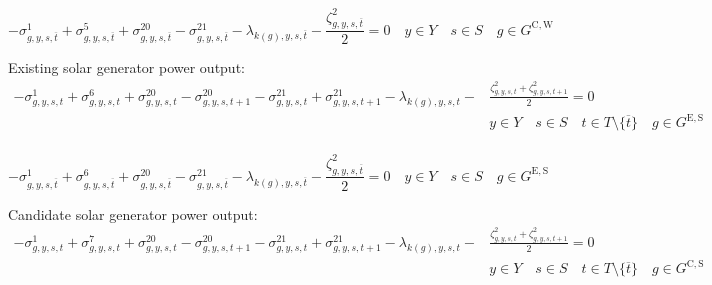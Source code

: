 \documentclass{article}
\newcommand{\sGeneratorsExistingSolar}{G^{\mathrm{E,S}}}
\newcommand{\sGeneratorsCandidateWind}{G^{\mathrm{C,W}}}
\newcommand{\sGeneratorsCandidateSolar}{G^{\mathrm{C,S}}}
\newcommand{\sYears}{Y}
\newcommand{\sScenarios}{S}
\newcommand{\sIntervals}{T}
\newcommand{\iGenerator}{g}
\newcommand{\iYear}{y}
\newcommand{\iScenario}{s}
\newcommand{\iInterval}{t}
\newcommand{\iIntervalTerminal}{\overline{\iInterval}}
\newcommand{\iZone}{z}
\newcommand{\dMinPowerOutput}[1][\iGenerator,\iYear,\iScenario,\iInterval]{\sigma_{#1}^{1}}
\newcommand{\dMaxPowerOutputWindCandidate}[1][\iGenerator,\iYear,\iScenario,\iInterval]{\sigma_{#1}^{5}}
\newcommand{\dMaxPowerOutputSolarExisting}[1][\iGenerator,\iYear,\iScenario,\iInterval]{\sigma_{#1}^{6}}
\newcommand{\dMaxPowerOutputSolarCandidate}[1][\iGenerator,\iYear,\iScenario,\iInterval]{\sigma_{#1}^{7}}
\newcommand{\dRampRateUp}[1][\iGenerator,\iYear,\iScenario,\iInterval]{\sigma_{#1}^{20}}
\newcommand{\dRampRateDown}[1][\iGenerator,\iYear,\iScenario,\iInterval]{\sigma_{#1}^{21}}
\newcommand{\dPowerBalance}[1][\iZone,\iYear,\iScenario,\iInterval]{\lambda_{#1}}
\newcommand{\dGeneratorEnergyOutput}[1][\iGenerator,\iYear,\iScenario,\iInterval]{\zeta_{#1}^{2}}
\begin{document}
\begin{equation}
-\dMinPowerOutput[\iGenerator,\iYear,\iScenario,\iIntervalTerminal] + \dMaxPowerOutputWindCandidate[\iGenerator,\iYear,\iScenario,\iIntervalTerminal] + \dRampRateUp[\iGenerator,\iYear,\iScenario,\iIntervalTerminal] - \dRampRateDown[\iGenerator,\iYear,\iScenario,\iIntervalTerminal] - \dPowerBalance[k(\iGenerator),\iYear,\iScenario,\iIntervalTerminal] - \frac{\dGeneratorEnergyOutput[\iGenerator,\iYear,\iScenario,\iIntervalTerminal]}{2} = 0 \quad \iYear \in \sYears \quad \iScenario \in \sScenarios \quad \iGenerator \in \sGeneratorsCandidateWind
\end{equation}

Existing solar generator power output:
\begin{align}
-\dMinPowerOutput + \dMaxPowerOutputSolarExisting + \dRampRateUp - \dRampRateUp[\iGenerator,\iYear,\iScenario,\iInterval+1] - \dRampRateDown + \dRampRateDown[\iGenerator,\iYear,\iScenario,\iInterval+1] - \dPowerBalance[k(\iGenerator),\iYear,\iScenario,\iInterval] - & \frac{\dGeneratorEnergyOutput + \dGeneratorEnergyOutput[\iGenerator,\iYear,\iScenario,\iInterval+1]}{2} = 0 \\\nonumber
& \iYear \in \sYears \quad \iScenario \in \sScenarios \quad \iInterval \in \sIntervals \setminus \{\iIntervalTerminal\} \quad \iGenerator \in \sGeneratorsExistingSolar\\\nonumber
\end{align}

\begin{equation}
-\dMinPowerOutput[\iGenerator,\iYear,\iScenario,\iIntervalTerminal] + \dMaxPowerOutputSolarExisting[\iGenerator,\iYear,\iScenario,\iIntervalTerminal] + \dRampRateUp[\iGenerator,\iYear,\iScenario,\iIntervalTerminal] - \dRampRateDown[\iGenerator,\iYear,\iScenario,\iIntervalTerminal] - \dPowerBalance[k(\iGenerator),\iYear,\iScenario,\iIntervalTerminal] - \frac{\dGeneratorEnergyOutput[\iGenerator,\iYear,\iScenario,\iIntervalTerminal]}{2} = 0 \quad \iYear \in \sYears \quad \iScenario \in \sScenarios \quad \iGenerator \in \sGeneratorsExistingSolar
\end{equation}

Candidate solar generator power output:
\begin{align}
-\dMinPowerOutput + \dMaxPowerOutputSolarCandidate + \dRampRateUp - \dRampRateUp[\iGenerator,\iYear,\iScenario,\iInterval+1] - \dRampRateDown + \dRampRateDown[\iGenerator,\iYear,\iScenario,\iInterval+1] - \dPowerBalance[k(\iGenerator),\iYear,\iScenario,\iInterval] - & \frac{\dGeneratorEnergyOutput + \dGeneratorEnergyOutput[\iGenerator,\iYear,\iScenario,\iInterval+1]}{2} = 0 \\\nonumber
& \iYear \in \sYears \quad \iScenario \in \sScenarios \quad \iInterval \in \sIntervals \setminus \{\iIntervalTerminal\} \quad \iGenerator \in \sGeneratorsCandidateSolar\\\nonumber
\end{align}
\end{document}
